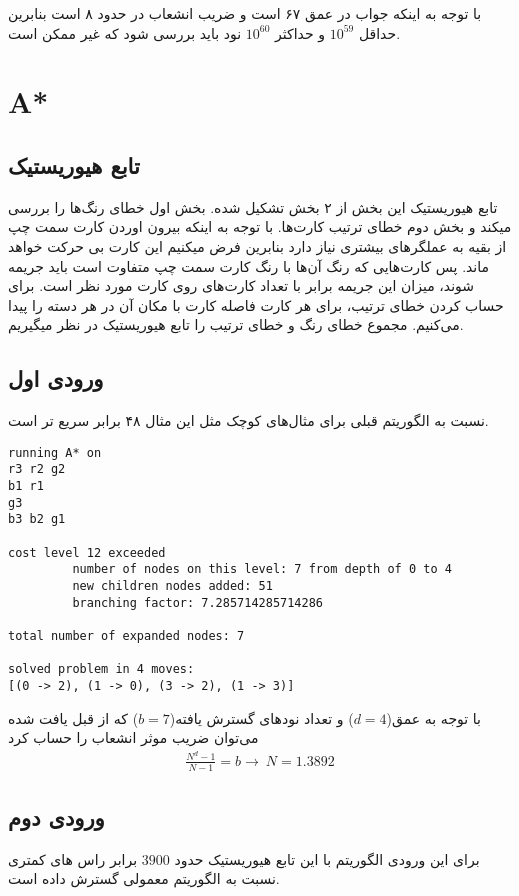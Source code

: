 \documentclass{article}
\begin{document}
با توجه به اینکه جواب در عمق ۶۷ است و ضریب انشعاب در حدود ۸ است بنابرین حداقل $10^{59}$ و حداکثر $10^{60}$ نود باید بررسی شود که غیر ممکن است.

\newpage
\section*{A*}

\subsection*{تابع هیوریستیک}
تابع هیوریستیک این بخش از ۲ بخش تشکیل شده. بخش اول خطای رنگ‌ها را بررسی میکند و بخش دوم خطای ترتیب کارت‌ها.
با توجه به اینکه بیرون اوردن کارت سمت چپ از بقیه به عملگرهای بیشتری نیاز دارد بنابرین فرض میکنیم این کارت بی حرکت خواهد ماند. پس کارت‌هایی که رنگ آن‌ها با رنگ کارت سمت چپ متفاوت است باید جریمه شوند، میزان این جریمه برابر با تعداد کارت‌های روی کارت مورد نظر است.
برای حساب کردن خطای ترتیب، برای هر کارت فاصله کارت با مکان آن در هر دسته را پیدا می‌کنیم. مجموع خطای رنگ و خطای ترتیب را تابع هیوریستیک در نظر میگیریم.


\subsection*{ورودی اول}

نسبت به الگوریتم قبلی برای مثال‌های کوچک مثل این مثال ۴۸ برابر سریع تر است.
\begin{latin}
\begin{lstlisting}
running A* on 
r3 r2 g2
b1 r1
g3
b3 b2 g1

cost level 12 exceeded
         number of nodes on this level: 7 from depth of 0 to 4
         new children nodes added: 51
         branching factor: 7.285714285714286

total number of expanded nodes: 7

solved problem in 4 moves:
[(0 -> 2), (1 -> 0), (3 -> 2), (1 -> 3)]
\end{lstlisting}
\end{latin}

با توجه به عمق($d=4$) و تعداد نود‌های گسترش یافته($b = 7$) که از قبل یافت شده می‌توان ضریب موثر انشعاب را حساب کرد
\begin{align*}
\frac{N^d - 1}{N - 1} = b \rightarrow\ N = 1.3892
\end{align*}

\subsection*{ورودی دوم}
برای این ورودی الگوریتم با این تابع هیوریستیک حدود $3900$ برابر راس های کمتری نسبت به الگوریتم معمولی گسترش داده است.
\end{document}
